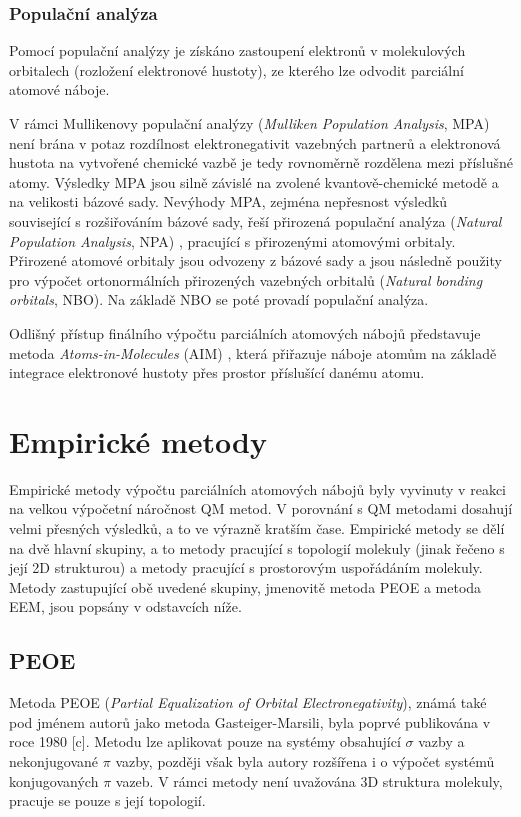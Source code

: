 \subsubsection{Populační analýza}
Pomocí populační analýzy je získáno zastoupení elektronů v molekulových orbitalech (rozložení elektronové hustoty), ze kterého lze odvodit parciální atomové náboje. 

V rámci Mullikenovy populační analýzy (\textit{Mulliken Population Analysis}, MPA) \cite{MPA} není brána v potaz rozdílnost elektronegativit vazebných partnerů a elektronová hustota na vytvořené chemické vazbě je tedy rovnoměrně rozdělena mezi příslušné atomy. Výsledky MPA jsou silně závislé na zvolené kvantově-chemické metodě a na velikosti bázové sady. Nevýhody MPA, zejména nepřesnost výsledků související s rozšiřováním bázové sady, řeší přirozená populační analýza (\textit{Natural Population Analysis}, NPA) \cite{NPA}, pracující s přirozenými atomovými orbitaly. Přirozené atomové orbitaly jsou odvozeny z bázové sady a jsou následně použity pro výpočet ortonormálních přirozených vazebných orbitalů (\textit{Natural bonding orbitals}, NBO). Na základě NBO se poté provadí populační analýza.

Odlišný přístup finálního výpočtu parciálních atomových nábojů představuje metoda \textit{Atoms-in-Molecules} (AIM) \cite{AIM}, která přiřazuje náboje atomům na základě integrace elektronové hustoty přes prostor příslušící danému atomu. 

\section{Empirické metody}
Empirické metody výpočtu parciálních atomových nábojů byly vyvinuty v reakci na velkou výpočetní náročnost QM metod. V porovnání s QM metodami dosahují velmi přesných výsledků, a to ve výrazně kratším čase. Empirické metody se dělí na dvě hlavní skupiny, a to metody pracující s topologií molekuly (jinak řečeno s její 2D strukturou) a metody pracující s prostorovým uspořádáním molekuly. Metody zastupující obě uvedené skupiny, jmenovitě metoda PEOE a metoda EEM, jsou popsány v odstavcích níže.
\subsection{PEOE}
Metoda PEOE (\textit{Partial Equalization of Orbital Electronegativity}), známá také pod jménem autorů jako metoda Gasteiger-Marsili, byla poprvé publikována v roce 1980 [c]. Metodu lze aplikovat pouze na systémy obsahující $\sigma$ vazby a nekonjugované $\pi$  vazby, později však byla autory rozšířena i o výpočet systémů konjugovaných $\pi$ vazeb. V rámci metody není uvažována 3D struktura molekuly, pracuje se pouze s její topologií. 

